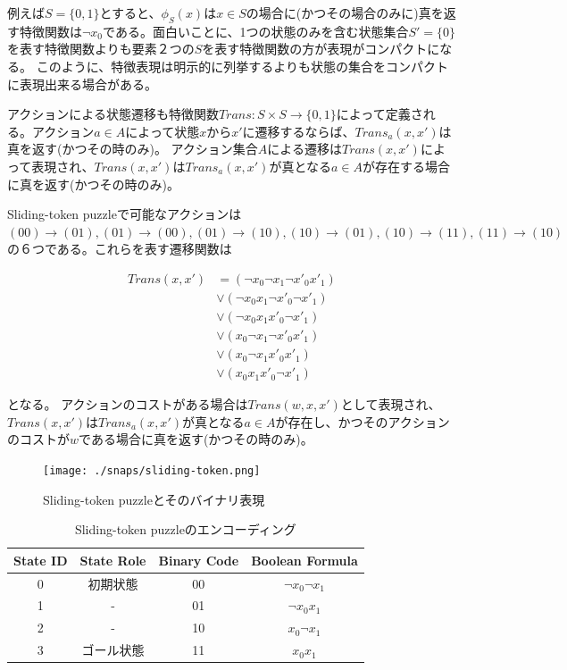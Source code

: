 \documentclass[10pt]{book}
\begin{document}
例えば$S = \{0, 1\}$とすると、$\phi_{S}(x)$は$x \in S$の場合に(かつその場合のみに)真を返す特徴関数は$\lnot x_0$である。面白いことに、1つの状態のみを含む状態集合$S' = \{0\}$を表す特徴関数よりも要素２つの$S$を表す特徴関数の方が表現がコンパクトになる。
このように、特徴表現は明示的に列挙するよりも状態の集合をコンパクトに表現出来る場合がある。

アクションによる状態遷移も特徴関数$Trans: S \times S \rightarrow \{0, 1\}$によって定義される。アクション$a \in A$によって状態$x$から$x'$に遷移するならば、$Trans_a(x,x')$は真を返す(かつその時のみ)。
アクション集合$A$による遷移は$Trans(x,x')$によって表現され、$Trans(x,x')$は$Trans_a(x,x')$が真となる$a \in A$が存在する場合に真を返す(かつその時のみ)。

Sliding-token puzzleで可能なアクションは$(00) \rightarrow (01), (01) \rightarrow (00), (01) \rightarrow (10), (10) \rightarrow (01), (10) \rightarrow (11), (11) \rightarrow (10)$の６つである。これらを表す遷移関数は

\begin{equation}
\begin{split}
	Trans(x,x') &= (\lnot x_0 \lnot x_1 \lnot x'_0 x'_1) \\
		&\lor (\lnot x_0 x_1 \lnot x'_0 \lnot x'_1) \\
		&\lor (\lnot x_0 x_1 x'_0 \lnot x'_1) \\
		&\lor (x_0 \lnot x_1 \lnot x'_0 x'_1) \\
		&\lor (x_0 \lnot x_1 x'_0 x'_1) \\
		&\lor (x_0 x_1 x'_0 \lnot x'_1)
\end{split}
\end{equation}

となる。
アクションのコストがある場合は$Trans(w, x, x')$として表現され、$Trans(x,x')$は$Trans_a(x,x')$が真となる$a \in A$が存在し、かつそのアクションのコストが$w$である場合に真を返す(かつその時のみ)。



\begin{figure}
\centering
\texttt{[image: ./snaps/sliding-token.png]}
\caption{Sliding-token puzzleとそのバイナリ表現}
\label{fig:sliding-token}
\end{figure}

\begin{table}
\centering
\caption{Sliding-token puzzleのエンコーディング}
\label{tbl:sliding-token}
\begin{tabular}{c|c|c|c}
	State ID & State Role & Binary Code & Boolean Formula \\ \hline
	0		& 初期状態	& 00				& $\lnot x_0 \lnot x_1$ \\	
	1		& -			& 01				& $\lnot x_0  x_1$ \\	
	2		& -			& 10				& $x_0 \lnot x_1$ \\	
	3		& ゴール状態	& 11				& $x_0 x_1$ \\	
\end{tabular}
\end{table}
\end{document}
